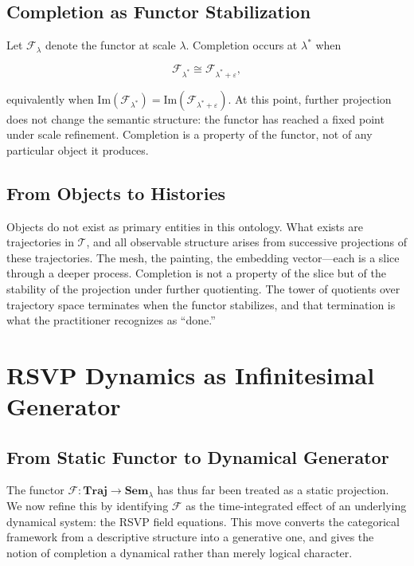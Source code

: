 \documentclass[11pt, twoside]{article}
\theoremstyle{plain}
\theoremstyle{definition}
\theoremstyle{remark}
\begin{document}
\subsection{Completion as Functor Stabilization}

Let $\mathcal{F}_\lambda$ denote the functor at scale $\lambda$. Completion occurs at $\lambda^*$ when

\[
\mathcal{F}_{\lambda^*} \cong \mathcal{F}_{\lambda^* + \varepsilon},
\]

equivalently when $\mathrm{Im}(\mathcal{F}_{\lambda^*}) = \mathrm{Im}(\mathcal{F}_{\lambda^* + \varepsilon})$. At this point, further projection does not change the semantic structure: the functor has reached a fixed point under scale refinement. Completion is a property of the functor, not of any particular object it produces.

\subsection{From Objects to Histories}

Objects do not exist as primary entities in this ontology. What exists are trajectories in $\mathcal{T}$, and all observable structure arises from successive projections of these trajectories. The mesh, the painting, the embedding vector---each is a slice through a deeper process. Completion is not a property of the slice but of the stability of the projection under further quotienting. The tower of quotients over trajectory space terminates when the functor stabilizes, and that termination is what the practitioner recognizes as ``done.''

\section{RSVP Dynamics as Infinitesimal Generator}
\label{sec:rsvp_generator}

\subsection{From Static Functor to Dynamical Generator}

The functor $\mathcal{F} : \mathbf{Traj} \to \mathbf{Sem}_\lambda$ has thus far been treated as a static projection. We now refine this by identifying $\mathcal{F}$ as the time-integrated effect of an underlying dynamical system: the RSVP field equations. This move converts the categorical framework from a descriptive structure into a generative one, and gives the notion of completion a dynamical rather than merely logical character.
\end{document}
